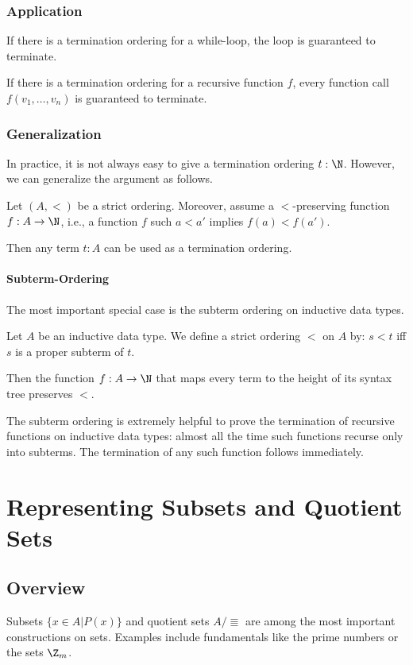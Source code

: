 \subsubsection{Application}

If there is a termination ordering for a while-loop, the loop is guaranteed to terminate.

If there is a termination ordering for a recursive function $f$, every function call $f(v_1,\ldots,v_n)$ is guaranteed to terminate.

\subsubsection{Generalization}

In practice, it is not always easy to give a termination ordering $t:\N$.
However, we can generalize the argument as follows.

Let $(A,<)$ be a strict ordering.
Moreover, assume a $<$-preserving function $f:A\to \N$, i.e., a function $f$ such $a<a'$ implies $f(a)<f(a')$.

Then any term $t:A$ can be used as a termination ordering.

\paragraph{Subterm-Ordering}
The most important special case is the subterm ordering on inductive data types.

Let $A$ be an inductive data type.
We define a strict ordering $<$ on $A$ by: $s<t$ iff $s$ is a proper subterm of $t$.

Then the function $f:A\to \N$ that maps every term to the height of its syntax tree preserves $<$.

The subterm ordering is extremely helpful to prove the termination of recursive functions on inductive data types: almost all the time such functions recurse only into subterms.
The termination of any such function follows immediately.

\section{Representing Subsets and Quotient Sets}

\subsection{Overview}

Subsets $\{x\in A|P(x)\}$ and quotient sets $A/\Equiv$ are among the most important constructions on sets.
Examples include fundamentals like the prime numbers or the sets $\Z_m$.

